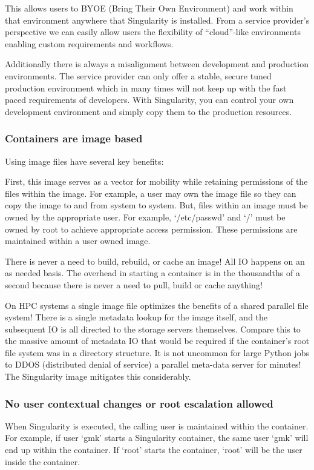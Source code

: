 \documentclass[letterpaper,10pt,english]{sphinxmanual}
\begin{document}
This allows users to BYOE (Bring Their Own Environment) and work within that environment anywhere that Singularity is installed. From a service provider’s perspective we can easily allow users the flexibility of “cloud”-like environments enabling custom requirements and workflows.

Additionally there is always a misalignment between development and production environments. The service provider can only offer a stable, secure tuned production environment which in many times will not keep up with the fast paced requirements of developers. With Singularity, you can control your own development environment and simply copy them to the production resources.


\subsubsection{Containers are image based}
\label{\detokenize{introduction:containers-are-image-based}}
Using image files have several key benefits:

First, this image serves as a vector for mobility while retaining permissions of the files within the image. For example, a user may own the image file so they can copy the image to and from system to system. But, files within an image must be owned by the appropriate user. For example, ‘/etc/passwd’ and ‘/’ must be owned by root to achieve appropriate access permission. These permissions are maintained within a user owned image.

There is never a need to build, rebuild, or cache an image! All IO happens on an as needed basis. The overhead in starting a container is in the thousandths of a second because there is never a need to pull, build or cache anything!

On HPC systems a single image file optimizes the benefits of a shared parallel file system! There is a single metadata lookup for the image itself, and the subsequent IO is all directed to the storage servers themselves. Compare this to the massive amount of metadata IO that would be required if the container’s root file system was in a directory structure. It is not uncommon for large Python jobs to DDOS (distributed denial of service) a parallel meta-data server for minutes! The Singularity image mitigates this considerably.


\subsubsection{No user contextual changes or root escalation allowed}
\label{\detokenize{introduction:no-user-contextual-changes-or-root-escalation-allowed}}
When Singularity is executed, the calling user is maintained within the container. For example, if user ‘gmk’ starts a Singularity container, the same user ‘gmk’ will end up within the container. If ‘root’ starts the container, ‘root’ will be the user inside the container.
\end{document}
